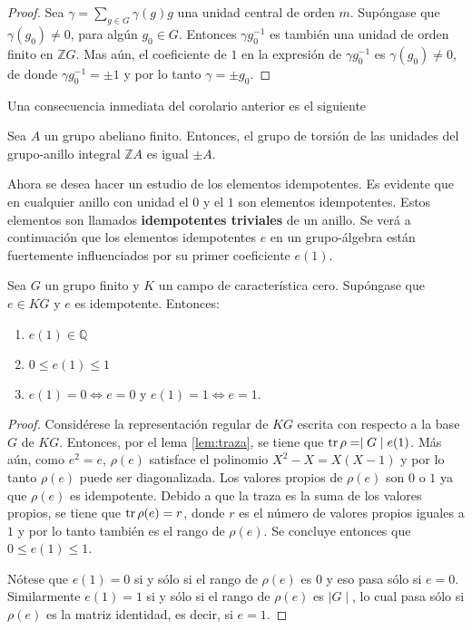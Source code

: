 \begin{proof}
Sea $\gamma = \sum_{g \in G}\gamma(g)g$ una unidad central de orden $m$. Supóngase que $\gamma(g_0) \neq 0$, para algún $g_0 \in G$. Entonces $\gamma g_0^{-1}$ es también una unidad de orden finito en $\mathds{Z}G$. Mas aún, el coeficiente de $1$ en la expresión de $\gamma g_0^{-1}$ es $\gamma(g_0) \neq 0$, de donde $\gamma g_0^{-1} = \pm 1$ y por lo tanto $\gamma = \pm g_0$.
\end{proof}
Una consecuencia inmediata del corolario anterior es el siguiente
\begin{teorema}\label{teo:Graham-Higman}
Sea $A$ un grupo abeliano finito. Entonces, el grupo de torsión de las unidades del grupo-anillo integral $\mathds{Z}A$ es igual $\pm A$.
\end{teorema}

Ahora se desea hacer un estudio de los elementos idempotentes. Es evidente que en cualquier anillo con unidad el $0$ y el $1$ son elementos idempotentes. Estos elementos son llamados \textbf{idempotentes triviales} de un anillo. Se verá a continuación que los elementos idempotentes $e$ en un grupo-álgebra están fuertemente influenciados por su primer coeficiente $e(1)$.

\begin{teorema}\label{teo:idme}
Sea $G$ un grupo finito y $K$ un campo de característica cero. Supóngase que $e \in KG$ y $e$ es idempotente. Entonces:
\begin{enumerate}
\item $e(1) \in \mathds{Q}$
\item $0 \leq e(1) \leq 1$
\item $e(1) = 0 \Leftrightarrow e = 0$ y $e(1) = 1 \Leftrightarrow e=1$.   
\end{enumerate} 
\end{teorema}
\begin{proof}
Considérese la representación regular de $KG$ escrita con respecto a la base $G$ de $KG$. Entonces, por el lema \ref{lem:traza}, se tiene que $\operatorname{tr}\rho = \mid G \mid e(1)$. Más aún, como $e^2 = e$, $\rho(e)$ satisface el polinomio $X^2 - X = X(X-1)$ y por lo tanto $\rho(e)$ puede ser diagonalizada. Los valores propios de $\rho(e)$ son $0$ o $1$ ya que $\rho(e)$ es idempotente. Debido a que la traza es la suma de los valores propios, se tiene que $\operatorname{tr}\rho(e) = r$, donde $r$ es el número de valores propios iguales a $1$ y por lo tanto también es el rango de $\rho(e)$. Se concluye entonces que $0\leq e(1) \leq 1$.

Nótese que $e(1) = 0 $ si y sólo si el rango de $\rho(e)$ es $0$ y eso pasa sólo si $e = 0$. Similarmente $e(1) = 1$ si y sólo si el rango de $\rho(e)$ es $\mid G \mid $, lo cual pasa sólo si $\rho(e)$ es la matriz identidad, es decir, si $e = 1$. 
\end{proof} 
